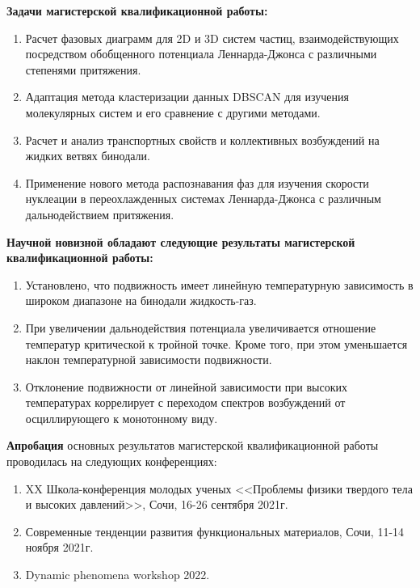 \textbf{Задачи магистерской квалификационной работы:}
\begin{enumerate}
\item Расчет фазовых диаграмм для 2D и 3D систем частиц, взаимодействующих посредством обобщенного потенциала Леннарда-Джонса с различными степенями притяжения. 
\item Адаптация метода кластеризации данных DBSCAN для изучения молекулярных систем и его сравнение с другими методами.
\item Расчет и анализ транспортных свойств и коллективных возбуждений на жидких ветвях бинодали.
\item Применение нового метода распознавания фаз для изучения скорости нуклеации в переохлажденных системах Леннарда-Джонса с различным дальнодействием притяжения. 
\end{enumerate}


\textbf{Научной новизной обладают следующие результаты магистерской
  квалификационной работы:}
\begin{enumerate}
\item Установлено, что подвижность имеет линейную температурную зависимость в широком диапазоне на бинодали жидкость-газ.
\item При увеличении дальнодействия потенциала увеличивается отношение температур критической к тройной точке.
  Кроме того, при этом уменьшается наклон температурной зависимости подвижности.
\item Отклонение подвижности от линейной зависимости при высоких температурах коррелирует с переходом спектров возбуждений от осциллирующего к монотонному виду.
\end{enumerate}


\textbf{Апробация} основных результатов магистерской квалификационной работы проводилась на следующих конференциях:
\begin{enumerate}
\item XX Школа-конференция молодых ученых <<Проблемы физики твердого тела и высоких давлений>>, Сочи, 16-26 сентября 2021г.
\item Современные тенденции развития функциональных материалов, Сочи, 11-14 ноября 2021г.
\item Dynamic phenomena workshop 2022.
\end{enumerate}


